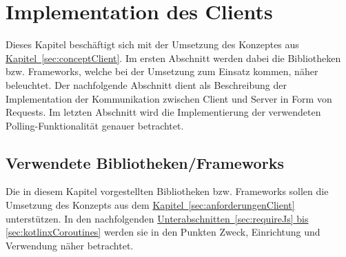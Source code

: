 
\chapter{Implementation des Clients}\label{chap:implementationClient}
Dieses Kapitel beschäftigt sich mit der Umsetzung des Konzeptes aus \hyperref[sec:conceptClient]{Kapitel~\ref{sec:conceptClient}}. Im ersten Abschnitt werden dabei die Bibliotheken bzw. Frameworks, welche bei der Umsetzung zum Einsatz kommen, näher beleuchtet. Der nachfolgende Abschnitt dient als Beschreibung der Implementation der Kommunikation zwischen Client und Server in Form von Requests. Im letzten Abschnitt wird die Implementierung der verwendeten Polling-Funktionalität genauer betrachtet.

\section{Verwendete Bibliotheken/Frameworks}
Die in diesem Kapitel vorgestellten Bibliotheken bzw. Frameworks sollen die Umsetzung des Konzepts aus dem \hyperref[sec:anforderungenClient]{Kapitel~\ref{sec:anforderungenClient}} unterstützen. In den nachfolgenden \hyperref[sec:requireJs, sec:kotlinxCoroutines]{Unterabschnitten~\ref{sec:requireJs} bis \ref{sec:kotlinxCoroutines}} werden sie in den Punkten Zweck, Einrichtung und Verwendung näher betrachtet.

